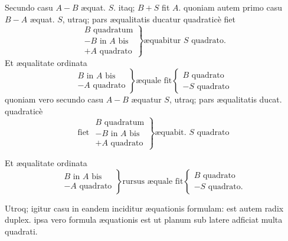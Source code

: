 \documentclass[11pt,a4paper]{article}
\begin{document}
Secundo casu $A - B$ æquat. $S$. itaq; $B + S$ fit $A$. quoniam autem primo casu $B - A$ æquat. $S$, utraq; pars æqualitatis ducatur quadraticè fiet
\[ \left.\begin{array}{l} B \text{ quadratum} \\ - B \text{ in } A \text{ bis} \\ + A \text{ quadrato} \end{array}\right\} \text{æquabitur } S \text{ quadrato.} \]
Et æqualitate ordinata
\[ \left.\begin{array}{l} B \text{ in } A \text{ bis} \\ - A \text{ quadrato} \end{array}\right\} \text{æquale fit} \left\{\begin{array}{l} B \text{ quadrato} \\ - S \text{ quadrato} \end{array}\right. \]
quoniam vero secundo casu $A - B$ æquatur $S$, utraq; pars æqualitatis ducat. quadraticè
\[ \text{fiet } \left.\begin{array}{l} B \text{ quadratum} \\ - B \text{ in } A \text{ bis} \\ + A \text{ quadrato} \end{array}\right\} \text{æquabit. } S \text{ quadrato} \]


Et æqualitate ordinata
\[ \left.\begin{array}{l} B \text{ in } A \text{ bis} \\ - A \text{ quadrato} \end{array}\right\} \text{rursus æquale fit} \left\{\begin{array}{l} B \text{ quadrato} \\ - S \text{ quadrato.} \end{array}\right. \]

Utroq; igitur casu in eandem inciditur æquationis formulam: est autem radix duplex. ipsa vero formula æquationis est ut planum sub latere adficiat multa quadrati.
\end{document}
